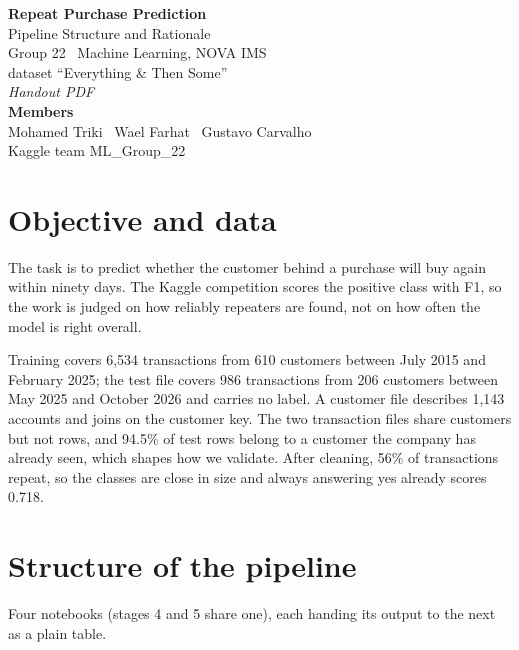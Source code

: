 \documentclass[11pt,a4paper]{article}
\begin{document}
\thispagestyle{empty}
\vspace*{\fill}
\begin{center}
{\Huge\bfseries Repeat Purchase Prediction}\\[8pt]
{\Large Pipeline Structure and Rationale}\\[26pt]
{\large Group 22 \textbullet\ Machine Learning, NOVA IMS}\\[4pt]
{\large dataset ``Everything \& Then Some''}\\[26pt]
{\large\itshape Handout PDF}\\[34pt]
{\bfseries Members}\\[3pt]
Mohamed Triki \textbullet\ Wael Farhat \textbullet\ Gustavo Carvalho\\[10pt]
{\small\color{black!60} Kaggle team ML\_Group\_22}
\end{center}
\vspace*{\fill}
\clearpage
\setcounter{page}{1}

\section{Objective and data}

The task is to predict whether the customer behind a purchase will buy again within ninety days. The Kaggle
competition scores the positive class with F1, so the work is
judged on how reliably repeaters are found, not on how often the model is right overall.

Training covers 6{,}534 transactions from 610 customers between July 2015 and February 2025; the test file
covers 986 transactions from 206 customers between May 2025 and October 2026 and carries no label. A customer
file describes 1{,}143 accounts and joins on the customer key. The two transaction files share customers but not
rows, and 94.5\% of test rows belong to a customer the company has already seen, which shapes how we validate. After cleaning, 56\% of transactions repeat, so the classes are close in size and
always answering yes already scores 0.718.

\section{Structure of the pipeline}

Four notebooks (stages 4 and 5 share one), each handing its output to the next as a plain table.
\end{document}
